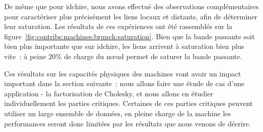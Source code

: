 De même que pour idchire, nous avons effectué des observations complémentaires pour caractériser plus précisément les liens locaux et distants, afin de déterminer leur saturation.
Les résultats de ces expériences ont été rassemblés sur la figure~\ref{fig:contribs:machines:brunch:saturation}.
Bien que la bande passante soit bien plus importante que sur idchire, les liens arrivent à saturation bien plus vite~: à peine 20\% de charge du nœud permet de saturer la bande passante.

\bigskip
\bigskip

Ces résultats sur les capacités physiques des machines vont avoir un impact important dans la section suivante~: nous allons faire une étude de cas d'une application - la factorisation de Cholesky, et nous allons en étudier individuellement les parties critiques.
Certaines de ces parties critiques peuvent utiliser un large ensemble de données, en pleine charge de la machine les performances seront donc limitées par les résultats que nous venons de décrire.

